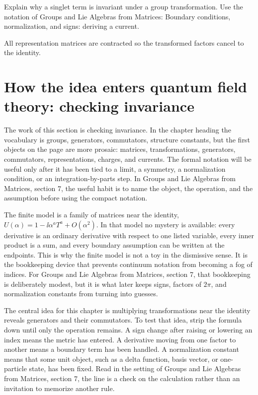 \begin{exercise}
Explain why a singlet term is invariant under a group transformation.  Use the notation of Groups and Lie Algebras from Matrices: Boundary conditions, normalization, and signs: deriving a current.
\begin{answer}
All representation matrices are contracted so the transformed factors cancel to the identity.
\end{answer}
\end{exercise}



\section{How the idea enters quantum field theory: checking invariance}

The work of this section is checking invariance.  In the chapter heading the vocabulary is groups, generators, commutators, structure constants, but the first objects on the page are more prosaic: matrices, transformations, generators, commutators, representations, charges, and currents.  The formal notation will be useful only after it has been tied to a limit, a symmetry, a normalization condition, or an integration-by-parts step.  In Groups and Lie Algebras from Matrices, section 7, the useful habit is to name the object, the operation, and the assumption before using the compact notation.

The finite model is a family of matrices near the identity, \(U(\alpha)=1-\ii\alpha^aT^a+O(\alpha^2)\).  In that model no mystery is available: every derivative is an ordinary derivative with respect to one listed variable, every inner product is a sum, and every boundary assumption can be written at the endpoints.  This is why the finite model is not a toy in the dismissive sense.  It is the bookkeeping device that prevents continuum notation from becoming a fog of indices.  For Groups and Lie Algebras from Matrices, section 7, that bookkeeping is deliberately modest, but it is what later keeps signs, factors of \(2\pi\), and normalization constants from turning into guesses.

The central idea for this chapter is multiplying transformations near the identity reveals generators and their commutators.  To test that idea, strip the formula down until only the operation remains.  A sign change after raising or lowering an index means the metric has entered.  A derivative moving from one factor to another means a boundary term has been handled.  A normalization constant means that some unit object, such as a delta function, basis vector, or one-particle state, has been fixed.  Read in the setting of Groups and Lie Algebras from Matrices, section 7, the line is a check on the calculation rather than an invitation to memorize another rule.

